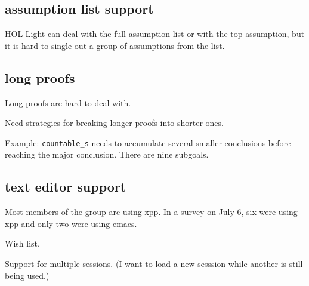 \subsection{assumption list support}

HOL Light can deal with the full assumption list or with the top assumption,
but it is hard to single out a  group of assumptions from the list.


\subsection{long proofs}

Long proofs are hard to deal with.

Need strategies for breaking longer proofs into shorter ones.

Example: \verb!countable_s! needs to accumulate several smaller
conclusions before reaching the major conclusion.  There are nine
subgoals.

\subsection{text editor support}

Most members of the group are using xpp.  In a survey on July 6, six
were using xpp and only two were using emacs.


Wish list.

Support for multiple sessions.  (I want to load a new sesssion while another
is still being used.)




